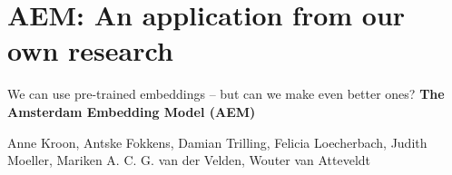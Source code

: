 \documentclass{beamer}
\begin{document}
\begin{frame}[plain]

\end{frame}


\section[AEM]{AEM: An application from our own research}

\begin{frame}[plain]
We can use pre-trained embeddings -- but can we make even better ones?
\textbf{The Amsterdam Embedding Model (AEM)}\\


\vspace{1cm}

{\footnotesize{Anne Kroon, Antske Fokkens, Damian Trilling, Felicia Loecherbach, Judith Moeller, Mariken A. C. G. van der Velden, Wouter van Atteveldt} }
\end{frame}



\end{document}
